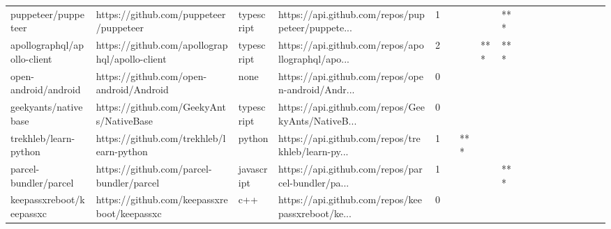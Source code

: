 \begin{tabular}{llllrlllllllllllll}
puppeteer/puppeteer                                &             https://github.com/puppeteer/puppeteer &        typescript &  https://api.github.com/repos/puppeteer/puppete... &       1 &         &        &           &            *** &                 &        &           &           &          &          &       &              &          \\
apollographql/apollo-client                        &     https://github.com/apollographql/apollo-client &        typescript &  https://api.github.com/repos/apollographql/apo... &       2 &         &        &       *** &            *** &                 &        &           &           &          &          &       &              &          \\
open-android/android                               &            https://github.com/open-android/Android &              none &  https://api.github.com/repos/open-android/Andr... &       0 &         &        &           &                &                 &        &           &           &          &          &       &              &          \\
geekyants/nativebase                               &            https://github.com/GeekyAnts/NativeBase &        typescript &  https://api.github.com/repos/GeekyAnts/NativeB... &       0 &         &        &           &                &                 &        &           &           &          &          &       &              &          \\
trekhleb/learn-python                              &           https://github.com/trekhleb/learn-python &            python &  https://api.github.com/repos/trekhleb/learn-py... &       1 &         &    *** &           &                &                 &        &           &           &          &          &       &              &          \\
parcel-bundler/parcel                              &           https://github.com/parcel-bundler/parcel &        javascript &  https://api.github.com/repos/parcel-bundler/pa... &       1 &         &        &           &            *** &                 &        &           &           &          &          &       &              &          \\
keepassxreboot/keepassxc                           &        https://github.com/keepassxreboot/keepassxc &               c++ &  https://api.github.com/repos/keepassxreboot/ke... &       0 &         &        &           &                &                 &        &           &           &          &          &       &              &          \\

\end{tabular}
